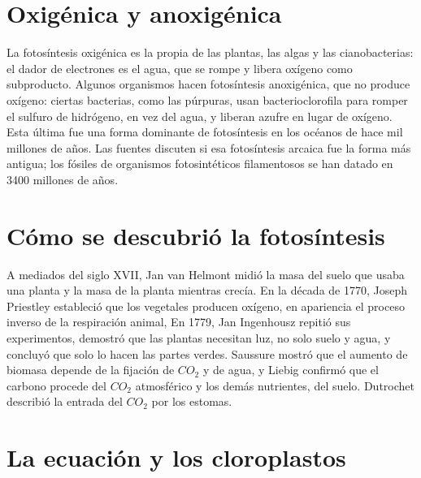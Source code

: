 \documentclass{book}
\begin{document}

\section{Oxigénica y anoxigénica}

La fotosíntesis oxigénica es la propia de las plantas, las algas y las cianobacterias: el dador de electrones es el agua, que se rompe y libera oxígeno como subproducto. Algunos organismos hacen fotosíntesis anoxigénica, que no produce oxígeno: ciertas bacterias, como las púrpuras, usan bacterioclorofila para romper el sulfuro de hidrógeno, en vez del agua, y liberan azufre en lugar de oxígeno. Esta última fue una forma dominante de fotosíntesis en los océanos de hace mil millones de años. Las fuentes discuten si esa fotosíntesis arcaica fue la forma más antigua; los fósiles de organismos fotosintéticos filamentosos se han datado en 3400 millones de años.


\section{Cómo se descubrió la fotosíntesis}

A mediados del siglo XVII, Jan van Helmont midió la masa del suelo que usaba una planta y la masa de la planta mientras crecía. En la década de 1770, Joseph Priestley estableció que los vegetales producen oxígeno, en apariencia el proceso inverso de la respiración animal, En 1779, Jan Ingenhousz repitió sus experimentos, demostró que las plantas necesitan luz, no solo suelo y agua, y concluyó que solo lo hacen las partes verdes. Saussure mostró que el aumento de biomasa depende de la fijación de \(CO_{2}\) y de agua, y Liebig confirmó que el carbono procede del \(CO_{2}\) atmosférico y los demás nutrientes, del suelo. Dutrochet describió la entrada del \(CO_{2}\) por los estomas.


\section{La ecuación y los cloroplastos}
\end{document}
